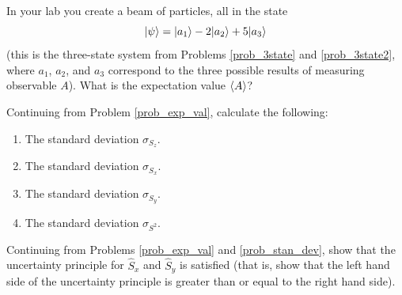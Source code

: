 \begin{problem}
\label{prob_3state3}

In your lab you create a beam of particles, all in the state
\[
| \psi \rangle = | a_1 \rangle - 2| a_2 \rangle + 5| a_3 \rangle
\]
(this is the three-state system from Problems \ref{prob_3state} and \ref{prob_3state2}, where $a_1$, $a_2$, and $a_3$ correspond to the three possible results of measuring observable $A$).  What is the expectation value $\langle A \rangle$?
\end{problem}


\begin{problem}
\label{prob_stan_dev}
Continuing from Problem \ref{prob_exp_val}, calculate the following:
\begin{enumerate}[label=(\alph*)]
\item The standard deviation $\sigma_{S_z}$.
\item The standard deviation $\sigma_{S_x}$.
\item The standard deviation $\sigma_{S_y}$.
\item The standard deviation $\sigma_{S^2}$.
\end{enumerate}
\end{problem}

\begin{problem}
\label{prob_unc_prin}
Continuing from Problems \ref{prob_exp_val} and \ref{prob_stan_dev}, show that the uncertainty principle for $\hat{S}_x$ and $\hat{S}_y$ is satisfied (that is, show that the left hand side of the uncertainty principle is greater than or equal to the right hand side).
\end{problem}

